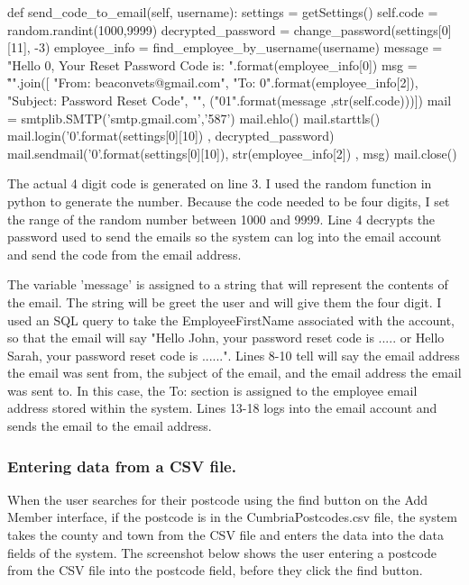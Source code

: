 \begin{python}
def send_code_to_email(self, username):
        settings = getSettings()
        self.code = random.randint(1000,9999)
        decrypted_password = change_password(settings[0][11], -3)
        employee_info = find_employee_by_username(username)
        message = "Hello {0}, \n \n Your Reset Password Code is:  ".format(employee_info[0])
        msg = "\r\n".join([
          "From: beaconvets@gmail.com",
          "To: {0}".format(employee_info[2]),
          "Subject: Password Reset Code",
          "",
          ("{0}{1}".format(message ,str(self.code)))])
        mail = smtplib.SMTP('smtp.gmail.com','587')
        mail.ehlo()
        mail.starttls()
        mail.login('{0}'.format(settings[0][10]) , decrypted_password)
        mail.sendmail('{0}'.format(settings[0][10]), str(employee_info[2]) , msg)
        mail.close()
\end{python}

The actual 4 digit code is generated on line 3. I used the random function in python to generate the number. Because the code needed to be four digits, I set the range of the random number between 1000 and 9999. Line 4 decrypts the password used to send the emails so the system can log into the email account and send the code from the email address. 

The variable 'message' is assigned to a string that will represent the contents of the email. The string will be greet the user and will give them the four digit. I used an SQL query to take the EmployeeFirstName associated with the account, so that the email will say "Hello John, your password reset code is ..... or Hello Sarah, your password reset code is ......". Lines 8-10 tell will say the email address the email was sent from, the subject of the email, and the email address the email was sent to. In this case, the To: section is assigned to the employee email address stored within the system. Lines 13-18 logs into the email account and sends the email to the email address.

\pagebreak

\subsubsection{Entering data from a CSV file.}
When the user searches for their postcode using the find button on the Add Member interface, if the postcode is in the CumbriaPostcodes.csv file, the system takes the county and town from the CSV file and enters the data into the data fields of the system. The screenshot below shows the user entering a postcode from the CSV file into the postcode field, before they click the find button.


